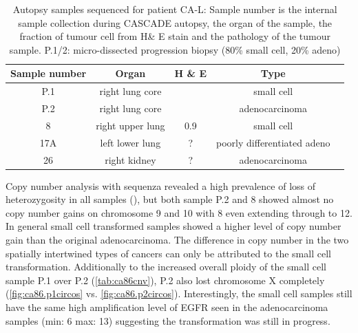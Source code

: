 \begin{table}[ht]
\caption[Autopsy samples sequenced for patient CA-L]{Autopsy samples sequenced for patient CA-L: Sample number is the internal sample collection during CASCADE autopsy, the organ of the sample, the fraction of tumour cell from H\& E stain and the pathology of the tumour sample. P.1/2: micro-dissected progression biopsy (80\% small cell, 20\% adeno)}\label{tab:ca86wesSamples}
\centering
{}
\begin{tabular}{|c|c|c|c|c|}
\toprule
\hline
 \rowcolor{gray!50}
\textbf{Sample number} & \textbf{Organ} & \textbf{H \& E} & \textbf{Type}\\
\hline
 P.1 & right lung core & \cellcolor{gray!15} & small cell \\
 P.2 & right lung core & \cellcolor{gray!15}\multirow{-2}{*}{>0.9} & adenocarcinoma \\
 8 & right upper lung & 0.9 & small cell \\
 17A & left lower lung & ? & poorly differentiated adeno \\
 26 & right kidney & ? & adenocarcinoma \\
 \hline
\bottomrule
\end{tabular}
\end{table} 


Copy number analysis with sequenza revealed a high prevalence of loss of heterozygosity in all samples (), but both sample P.2 and 8 showed almost no copy number gains on chromosome 9 and 10 with 8 even extending through to 12. In general small cell transformed samples showed a higher level of copy number gain than the original adenocarcinoma. The difference in copy number in the two spatially intertwined types of cancers can only be attributed to the small cell transformation. Additionally to the increased overall ploidy of the small cell sample P.1 over P.2 (\autoref{tab:ca86cnv}), P.2 also lost chromosome X completely  (\autoref{fig:ca86.p1circos} vs. \autoref{fig:ca86.p2circos}). Interestingly, the small cell samples still have the same high amplification level of EGFR seen in the adenocarcinoma samples (min: 6 max: 13) suggesting the transformation was still in progress.

